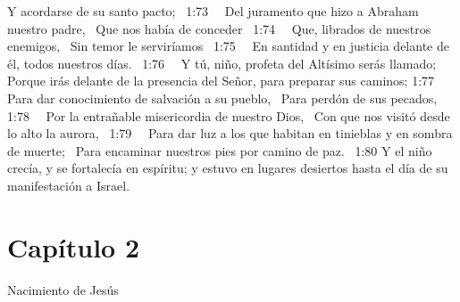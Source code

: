 Y acordarse de su santo pacto;  
1:73   Del juramento que hizo a Abraham nuestro padre,  
Que nos había de conceder  
1:74   Que, librados de nuestros enemigos,  
Sin temor le serviríamos  
1:75   En santidad y en justicia delante de él, todos nuestros días.  
1:76   Y tú, niño, profeta del Altísimo serás llamado;  
Porque irás delante de la presencia del Señor, para preparar sus caminos; 
1:77   Para dar conocimiento de salvación a su pueblo,  
Para perdón de sus pecados,  
1:78   Por la entrañable misericordia de nuestro Dios,  
Con que nos visitó desde lo alto la aurora,  
1:79   Para dar luz a los que habitan en tinieblas  y en sombra de muerte;  
Para encaminar nuestros pies por camino de paz.  
1:80 Y el niño crecía, y se fortalecía en espíritu; y estuvo en lugares desiertos hasta el día de su manifestación a Israel.  
\section*{Capítulo 2}
Nacimiento de Jesús   

